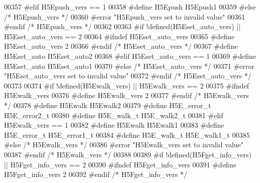 \begin{DoxyCode}
00357 \textcolor{preprocessor}{#elif H5Epush\_vers == 1}
00358 \textcolor{preprocessor}{  #define H5Epush H5Epush1}
00359 \textcolor{preprocessor}{#else }\textcolor{comment}{/* H5Epush\_vers */}\textcolor{preprocessor}{}
00360 \textcolor{preprocessor}{  #error "H5Epush\_vers set to invalid value"}
00361 \textcolor{preprocessor}{#endif }\textcolor{comment}{/* H5Epush\_vers */}\textcolor{preprocessor}{}
00362 
00363 \textcolor{preprocessor}{#if !defined(H5Eset\_auto\_vers) || H5Eset\_auto\_vers == 2}
00364 \textcolor{preprocessor}{  #ifndef H5Eset\_auto\_vers}
00365 \textcolor{preprocessor}{    #define H5Eset\_auto\_vers 2}
00366 \textcolor{preprocessor}{  #endif }\textcolor{comment}{/* H5Eset\_auto\_vers */}\textcolor{preprocessor}{}
00367 \textcolor{preprocessor}{  #define H5Eset\_auto H5Eset\_auto2}
00368 \textcolor{preprocessor}{#elif H5Eset\_auto\_vers == 1}
00369 \textcolor{preprocessor}{  #define H5Eset\_auto H5Eset\_auto1}
00370 \textcolor{preprocessor}{#else }\textcolor{comment}{/* H5Eset\_auto\_vers */}\textcolor{preprocessor}{}
00371 \textcolor{preprocessor}{  #error "H5Eset\_auto\_vers set to invalid value"}
00372 \textcolor{preprocessor}{#endif }\textcolor{comment}{/* H5Eset\_auto\_vers */}\textcolor{preprocessor}{}
00373 
00374 \textcolor{preprocessor}{#if !defined(H5Ewalk\_vers) || H5Ewalk\_vers == 2}
00375 \textcolor{preprocessor}{  #ifndef H5Ewalk\_vers}
00376 \textcolor{preprocessor}{    #define H5Ewalk\_vers 2}
00377 \textcolor{preprocessor}{  #endif }\textcolor{comment}{/* H5Ewalk\_vers */}\textcolor{preprocessor}{}
00378 \textcolor{preprocessor}{  #define H5Ewalk H5Ewalk2}
00379 \textcolor{preprocessor}{  #define H5E\_error\_t H5E\_error2\_t}
00380 \textcolor{preprocessor}{  #define H5E\_walk\_t H5E\_walk2\_t}
00381 \textcolor{preprocessor}{#elif H5Ewalk\_vers == 1}
00382 \textcolor{preprocessor}{  #define H5Ewalk H5Ewalk1}
00383 \textcolor{preprocessor}{  #define H5E\_error\_t H5E\_error1\_t}
00384 \textcolor{preprocessor}{  #define H5E\_walk\_t H5E\_walk1\_t}
00385 \textcolor{preprocessor}{#else }\textcolor{comment}{/* H5Ewalk\_vers */}\textcolor{preprocessor}{}
00386 \textcolor{preprocessor}{  #error "H5Ewalk\_vers set to invalid value"}
00387 \textcolor{preprocessor}{#endif }\textcolor{comment}{/* H5Ewalk\_vers */}\textcolor{preprocessor}{}
00388 
00389 \textcolor{preprocessor}{#if !defined(H5Fget\_info\_vers) || H5Fget\_info\_vers == 2}
00390 \textcolor{preprocessor}{  #ifndef H5Fget\_info\_vers}
00391 \textcolor{preprocessor}{    #define H5Fget\_info\_vers 2}
00392 \textcolor{preprocessor}{  #endif }\textcolor{comment}{/* H5Fget\_info\_vers */}\textcolor{preprocessor}{}

\end{DoxyCode}
